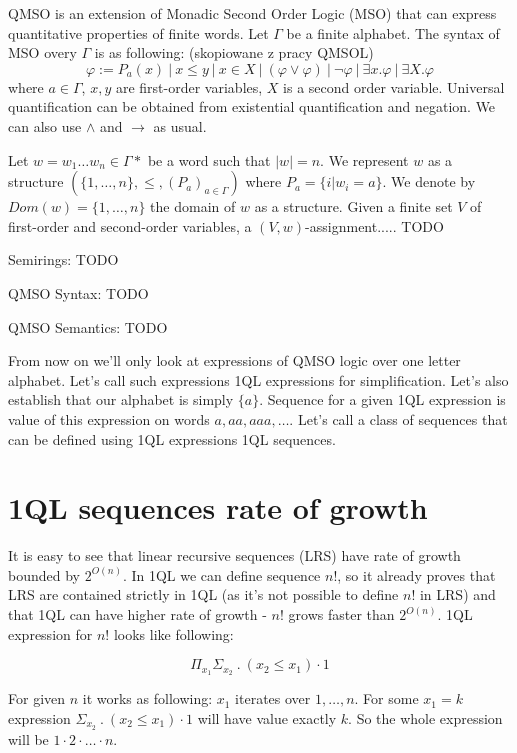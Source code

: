 \documentclass[12pt]{article}
\theoremstyle{definition}
\begin{document}
QMSO is an extension of Monadic Second Order Logic (MSO) that can express quantitative properties of finite words. Let $\Gamma$ be a finite alphabet. The syntax of MSO overy $\Gamma$ is as following: (skopiowane z pracy QMSOL)
$$ \varphi := P_a(x) \ | \ x \leq y \ | \ x \in X \ | \ (\varphi \lor \varphi) \ | \ \neg \varphi \ | \ \exists x. \varphi \ | \ \exists X . \varphi $$
where $a \in \Gamma$, $x, y$ are first-order variables, $X$ is a second order variable. Universal quantification can be obtained from existential quantification and negation. We can also use $\land$ and $\rightarrow$ as usual.

Let $w = w_1\ldots w_n \in \Gamma*$ be a word such that $|w| = n$. We represent $w$ as a structure $(\{1,\ldots,n\}, \leq, (P_a)_{a \in \Gamma})$ where $P_a = \{i | w_i = a\}$. We denote by $Dom(w) = \{1,\ldots,n\}$ the domain of $w$ as a structure. Given a finite set $V$ of first-order and second-order variables, a $(V, w)$-assignment..... TODO

Semirings: TODO

QMSO Syntax: TODO

QMSO Semantics: TODO

From now on we'll only look at expressions of QMSO logic over one letter alphabet. Let's call such expressions 1QL expressions for simplification. Let's also establish that our alphabet is simply $\{a\}$. Sequence for a given 1QL expression is value of this expression on words $a, aa, aaa, \ldots$. Let's call a class of sequences that can be defined using 1QL expressions 1QL sequences.

\section{1QL sequences rate of growth}
It is easy to see that linear recursive sequences (LRS) have rate of growth bounded by $2^{O(n)}$. In 1QL we can define sequence $n!$, so it already proves that LRS are contained strictly in 1QL (as it's not possible to define $n!$ in LRS) and that 1QL can have higher rate of growth - $n!$ grows faster than $2^{O(n)}$. 1QL expression for $n!$ looks like following:

$$\Pi_{x_1}\Sigma_{x_2} \ . \ (x_2 \leq x_1) \cdot 1$$

For given $n$ it works as following: $x_1$ iterates over $1,\ldots,n$. For some $x_1 = k$ expression $\Sigma_{x_2} \ . \ (x_2 \leq x_1) \cdot 1$ will have value exactly $k$. So the whole expression will be $1 \cdot 2 \cdot \ldots \cdot n$.
\end{document}
